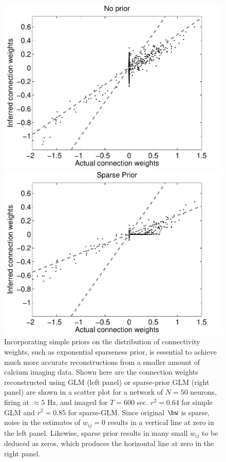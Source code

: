 \begin{figure}[h]
\centering
\begin{minipage}[c]{0.45\hsize}
\includegraphics[width=\hsize]{../figs/FigureA10_regular_sol}
\end{minipage}
\begin{minipage}[c]{0.45\hsize}
\includegraphics[width=\hsize]{../figs/FigureA10_sparse_sol}
\end{minipage}
\caption{
Incorporating simple priors on the distribution of connectivity weights, such as exponential sparseness prior, is essential to achieve much more accurate reconstructions from a smaller amount of calcium imaging data.
Shown here are the connection weights reconstructed using GLM (left panel) or sparse-prior GLM (right panel) are shown in a scatter plot for a network of $N=50$ neurons, firing at $\approx 5$ Hz, and imaged for $T=600$ sec. $r^2=0.64$ for simple GLM and $r^2=0.85$ for sparse-GLM.
Since original $\bw$ is sparse, noise in the estimates of $w_{ij}=0$ results in a vertical line at zero in the left panel.
Likewise, sparse prior results in many small $w_{ij}$ to be deduced as zeros, which produces the horizontal line at zero in the right panel.
}
\label{fig:sparse}
\end{figure}

